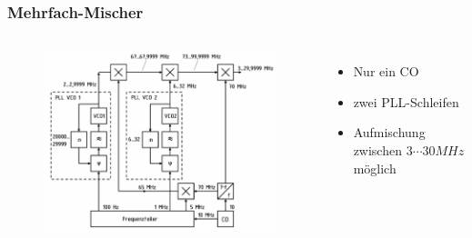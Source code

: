 \begin{frame}
  \frametitle{Mehrfach-Mischer}


  \begin{columns}[c]
    \begin{figure}
      \includegraphics[width=\textwidth,height=.75\textheight,keepaspectratio]{a13/TG110.png}
    \end{figure}
    \begin{itemize}
      \item Nur ein CO
      \item zwei PLL-Schleifen
      \item Aufmischung zwischen $3\cdots30MHz$ möglich
    \end{itemize}
  \end{columns}
\end{frame}

